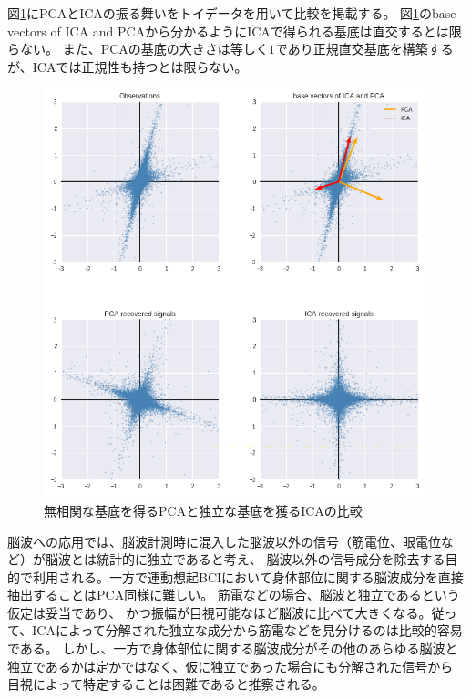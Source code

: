 図\ref{fig:ica_pca}にPCAとICAの振る舞いをトイデータを用いて比較を掲載する。
図\ref{fig:ica_pca}のbase vectors of ICA and PCAから分かるようにICAで得られる基底は直交するとは限らない。
また、PCAの基底の大きさは等しく\(1\)であり正規直交基底を構築するが、ICAでは正規性も持つとは限らない。
\begin{figure}
    \centering
    \includegraphics[width=13cm]{images/ica_pca.png}
    \caption{無相関な基底を得るPCAと独立な基底を獲るICAの比較}
    \label{fig:ica_pca}
\end{figure}


脳波への応用では、脳波計測時に混入した脳波以外の信号（筋電位、眼電位など）が脳波とは統計的に独立であると考え、
脳波以外の信号成分を除去する目的で利用される。一方で運動想起BCIにおいて身体部位に関する脳波成分を直接抽出することはPCA同様に難しい。
筋電などの場合、脳波と独立であるという仮定は妥当であり、
かつ振幅が目視可能なほど脳波に比べて大きくなる。従って、ICAによって分解された独立な成分から筋電などを見分けるのは比較的容易である。
しかし、一方で身体部位に関する脳波成分がその他のあらゆる脳波と独立であるかは定かではなく、仮に独立であった場合にも分解された信号から
目視によって特定することは困難であると推察される。

